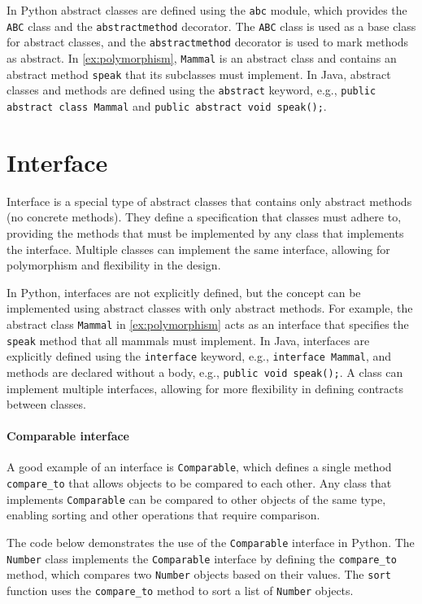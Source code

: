 \documentclass[oneside,11pt,dvipsnames]{book}
\newcommand{\code}[1]{\texttt{#1}}
\begin{document}
In Python abstract classes are defined using the \code{abc} module, which provides the \code{ABC} class and the \code{abstractmethod} decorator. The \code{ABC} class is used as a base class for abstract classes, and the \code{abstractmethod} decorator is used to mark methods as abstract. In \autoref{ex:polymorphism},
\code{Mammal} is an abstract class and contains an abstract method \code{speak} that its subclasses must implement.
In Java, abstract classes and methods are defined using the \code{abstract} keyword, e.g., \code{public abstract class Mammal} and \code{public abstract void speak();}.

\section{Interface}

Interface is a special type of abstract classes that contains only abstract methods (no concrete methods). They define a specification that classes must adhere to, providing the methods that must be implemented by any class that implements the interface. Multiple classes can implement the same interface, allowing for polymorphism and flexibility in the design.

In Python, interfaces are not explicitly defined, but the concept can be implemented using abstract classes with only abstract methods. For example, the abstract class \code{Mammal} in \autoref{ex:polymorphism} acts as an interface that specifies the \code{speak} method that all mammals must implement.
In Java, interfaces are explicitly defined using the \code{interface} keyword, e.g., \code{interface Mammal}, and methods are declared without a body, e.g., \code{public void speak();}. A class can implement multiple interfaces, allowing for more flexibility in defining contracts between classes.


\paragraph{Comparable interface} A good example of an interface is \code{Comparable}, which defines a single method \code{compare\_to} that allows objects to be compared to each other. Any class that implements \code{Comparable} can be compared to other objects of the same type, enabling sorting and other operations that require comparison.

The code below demonstrates the use of the \code{Comparable} interface in Python. The \code{Number} class implements the \code{Comparable} interface by defining the \code{compare\_to} method, which compares two \code{Number} objects based on their values. The \code{sort} function uses the \code{compare\_to} method to sort a list of \code{Number} objects.
\end{document}
